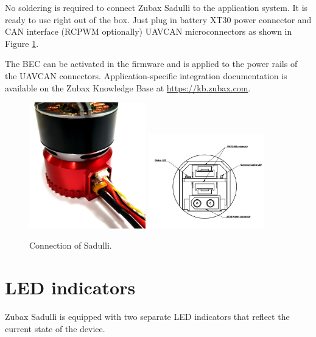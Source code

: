 \documentclass{zubaxdoc}
\begin{document}
No soldering is required to connect Zubax Sadulli to the application system. 
It is ready to use right out of the box. Just plug in battery XT30 power connector and CAN interface (RCPWM optionally) UAVCAN microconnectors as shown in Figure \ref{Sadulli_connectors}. 

The BEC can be activated in the firmware and is applied to the power rails of the UAVCAN connectors.
Application-specific integration documentation is available on the Zubax Knowledge Base at
\mbox{\url{https://kb.zubax.com}}.

\begin{figure}[hb]
    \includegraphics[width=0.45\textwidth]{sadulli-connectors} \includegraphics[width=0.45\textwidth]{connectors}
    \caption{Connection of Sadulli.
    \label{Sadulli_connectors}}
\end{figure}


\section{LED indicators}

\newcommand{\LEDX}{{\rule{0.4em}{1.0em}}}
\newcommand{\LEDO}{{\rule{0.4em}{0.1em}}}

\newcommand{\ShowColor}[1]{{\color{#1}\rule{2em}{0.8em}}}

Zubax Sadulli is equipped with two separate LED indicators that reflect the current state of the device.
\end{document}
